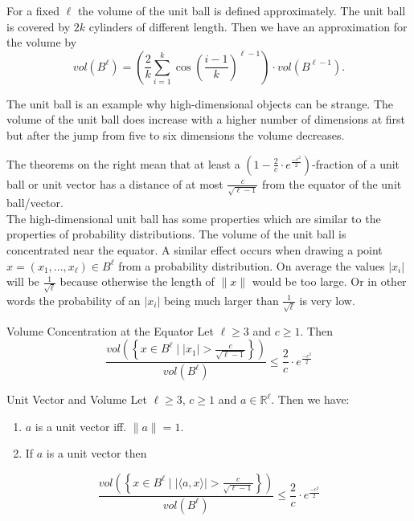 \documentclass[english]{panikzettel}
\begin{document}
For a fixed $\ell$ the volume of the unit ball is defined approximately. The unit ball is covered by $2k$ cylinders of different length. Then we have an approximation for the volume by
\[
vol(B^\ell)=\left(\frac{2}{k} \sum_{i=1}^k \cos \left( \frac{i-1}{k}\right)^{\ell-1} \right)\cdot vol(B^{\ell-1}).
\]

The unit ball is an example why high-dimensional objects can be strange. The volume of the unit ball does increase with a higher number of dimensions at first but after the jump from five to six dimensions the volume decreases.

\begin{halfboxl}
\vspace{-\baselineskip}
	The theorems on the right mean that at least a $(1-\frac{2}{c}\cdot e^{\frac{-c^2}{2}})$-fraction of a unit ball or unit vector has a distance of at most $\frac{c}{\sqrt{\ell -1}}$ from the equator of the unit ball/vector.\\

	The high-dimensional unit ball has some properties which are similar to the properties of probability distributions. The volume of the unit ball is concentrated near the equator. A similar effect occurs when drawing a point $x=(x_1,...,x_\ell)\in B^\ell$ from a probability distribution. On average the values $|x_i|$ will be $\frac{1}{\sqrt{\ell}}$ because otherwise the length of $\parallel x\parallel$ would be too large. Or in other words the probability of an $|x_i|$ being much larger than $\frac{1}{\sqrt{\ell}}$ is very low.
\end{halfboxl}
\begin{halfboxr}
\vspace{-\baselineskip}
	\begin{theo}{Volume Concentration at the Equator}
	Let $\ell\geq 3$ and $c\geq 1$. Then
	\[
	\frac{vol\left(\left\lbrace x\in B^\ell \mid |x_1|>\frac{c}{\sqrt{\ell-1}} \right\rbrace\right)}{vol(B^\ell)}\leq \frac{2}{c}\cdot e^{\frac{-c^2}{2}}
	\]
	\end{theo}
	\begin{theo}{Unit Vector and Volume}
	Let $\ell\geq 3$, $c\geq 1$ and $a\in\mathbb{R}^\ell$. Then we have:
	\begin{enumerate}
	\item $a$ is a unit vector iff. $\parallel a \parallel =1$.
	\item If $a$ is a unit vector then
	\end{enumerate}
	\[
	\frac{vol\left(\left\lbrace x\in B^\ell \mid |\langle a,x \rangle|>\frac{c}{\sqrt{\ell-1}} \right\rbrace\right)}{vol(B^\ell)}\leq \frac{2}{c}\cdot e^{\frac{-c^2}{2}}
	\]

	\end{theo}
\end{halfboxr}
\end{document}
